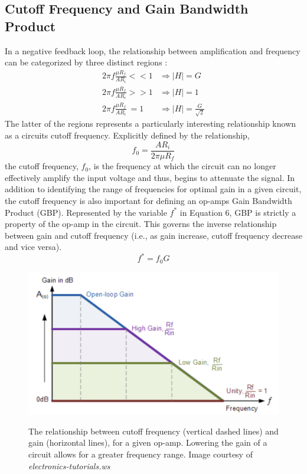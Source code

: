 \documentclass[letterpaper,12pt]{article}
\begin{document}
\subsection{Cutoff Frequency and Gain Bandwidth Product}
In a negative feedback loop, the relationship between amplification and frequency can be categorized by three distinct regions :
\begin{align*}
    2 \pi f \frac{\mu R_f}{A R_i} << 1 &  \Rightarrow |H| = G \\
    2 \pi f \frac{\mu R_f}{A R_i} >> 1 &  \Rightarrow |H| = 1 \\
    2 \pi f \frac{\mu R_f}{A R_i} \ =1 &  \Rightarrow |H| = \frac{G}{\sqrt{2}}
\end{align*}
The latter of the regions represents a particularly interesting relationship known as a circuits cutoff frequency. Explicitly defined by the relationship,
\begin{equation}
    \label{cutoff}
    f_0 = \frac{A R_i}{2\pi \mu R_f}
\end{equation}
the cutoff frequency, $f_0$, is the frequency at which the circuit can no longer effectively amplify the input voltage and thus, begins to attenuate the signal. In addition to identifying the range of frequencies for optimal gain in a given circuit, the cutoff frequency is also important for defining an op-amps Gain Bandwidth Product (GBP). Represented by the variable $f^*$ in Equation 6, GBP is strictly a property of the op-amp in the circuit. This governs the inverse relationship between gain and cutoff frequency (i.e., as gain increase, cutoff frequency decrease and vice versa).
\begin{equation}
    \label{GBP}
    f^* = f_0G
\end{equation}

\begin{figure}[ht]
    \centering
    \includegraphics[scale = .5]{GBPpic.png}
    \label{GBPpic}
    \caption{\small The relationship between cutoff frequency (vertical dashed lines) and gain (horizontal lines), for a given op-amp. Lowering the gain of a circuit allows for a greater frequency range. Image courtesy of \textit{electronics-tutorials.ws}}
\end{figure}
\end{document}

